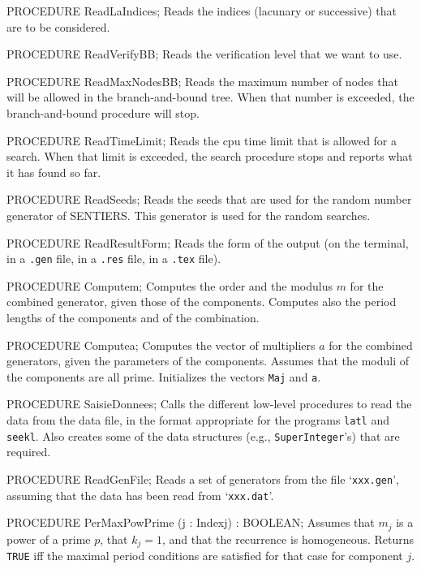 PROCEDURE ReadLaIndices;
\endcode
 \tab
  Reads the indices (lacunary or successive) that are to be considered.
 \endtab
\code

PROCEDURE ReadVerifyBB;
\endcode
 \tab
  Reads the verification level that we want to use.
 \endtab
\code

PROCEDURE ReadMaxNodesBB;
\endcode
 \tab
  Reads the maximum number of nodes that will be allowed in
  the branch-and-bound tree.  When that number is exceeded,
  the branch-and-bound procedure will stop.
 \endtab
\code

PROCEDURE ReadTimeLimit;
\endcode
 \tab
  Reads the cpu time limit that is allowed for a search.
  When that limit is exceeded, the search procedure stops
  and reports what it has found so far.
 \endtab
\code

PROCEDURE ReadSeeds;
\endcode
 \tab
  Reads the seeds that are used for the random number generator
  of SENTIERS.  This generator is used for the random searches.
 \endtab
\code

PROCEDURE ReadResultForm;
\endcode
 \tab
  Reads the form of the output (on the terminal, in a {\tt .gen} file,
  in a {\tt .res} file, in a {\tt .tex} file).
 \endtab
\code

PROCEDURE Computem;
\endcode
 \tab  Computes the order and the modulus $m$ for the 
   combined generator, given those of the components.
   Computes also the period lengths of the components and of
   the combination.
 \endtab
\code

PROCEDURE Computea;
\endcode
 \tab 
   Computes the vector of multipliers $a$ for the combined generators,
   given the parameters of the components.
   Assumes that the moduli of the components are all prime.
   Initializes the vectors {\tt Maj} and {\tt a}. 
 \endtab
\code

PROCEDURE SaisieDonnees;
\endcode
 \tab
  Calls the different low-level procedures to read the data
  from the data file, in the format appropriate for the programs
  {\tt latl} and {\tt seekl}.
  Also creates some of the data structures (e.g., {\tt SuperInteger}'s)
  that are required.
 \endtab
\code

PROCEDURE ReadGenFile;
\endcode
 \tab
  Reads a set of generators from the file `{\tt xxx.gen}',
  assuming that the data has been read from `{\tt xxx.dat}'. 
 \endtab
\code

PROCEDURE PerMaxPowPrime (j : Indexj) : BOOLEAN;
\endcode
 \tab
   Assumes that $m_j$ is a power of a prime $p$, that $k_j = 1$, 
   and that the recurrence is homogeneous.   
   Returns {\tt TRUE} iff the maximal period conditions are 
   satisfied for that case for component $j$.
 \endtab
\code

